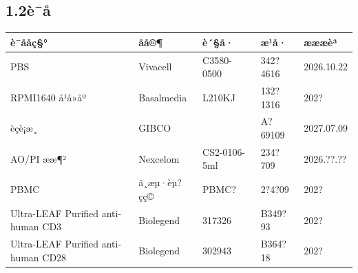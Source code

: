 \documentclass[UTF8,10pt,a4paper,fontset=fandol]{ctexart}
\newcommand{\fieldvalue}[1]{#1}
\newcommand{\handwritten}[1]{#1}
\begin{document}
\begin{center}
\begin{center}
\subsection{1.2\quad è¯å}

\begin{tabularx}{\textwidth}{|X|X|X|X|X|}
\hline
è¯ååç§° & åå®¶ & è´§å· & æ¹å· & æææè³\\
\hline
PBS & Vivacell & C3580-0500 &
\fieldvalue{\handwritten{342?4616}} &
\fieldvalue{\handwritten{2026.10.22}}\\
\hline
RPMI1640 å¹å»åº & Basalmedia & L210KJ &
\fieldvalue{\handwritten{132?1316}} &
\fieldvalue{\handwritten{202?}}\\
\hline
èçè¡æ¸ & GIBCO & &
\fieldvalue{\handwritten{A?69109}} &
\fieldvalue{\handwritten{2027.07.09}}\\
\hline
AO/PI ææ¶² & Nexcelom & CS2-0106-5ml &
\fieldvalue{\handwritten{234?709}} &
\fieldvalue{\handwritten{2026.??.??}}\\
\hline
PBMC & ä¸æµ·èµ?çç© &
\fieldvalue{\handwritten{PBMC?}} &
\fieldvalue{\handwritten{2?4?09}} &
\fieldvalue{\handwritten{202?}}\\
\hline
Ultra-LEAF Purified anti-human CD3 & Biolegend & 317326 &
\fieldvalue{\handwritten{B349?93}} &
\fieldvalue{\handwritten{202?}}\\
\hline
Ultra-LEAF Purified anti-human CD28 & Biolegend & 302943 &
\fieldvalue{\handwritten{B364?18}} &
\fieldvalue{\handwritten{202?}}\\
\hline
\end{tabularx}


\end{center}
\end{center}
\end{document}
